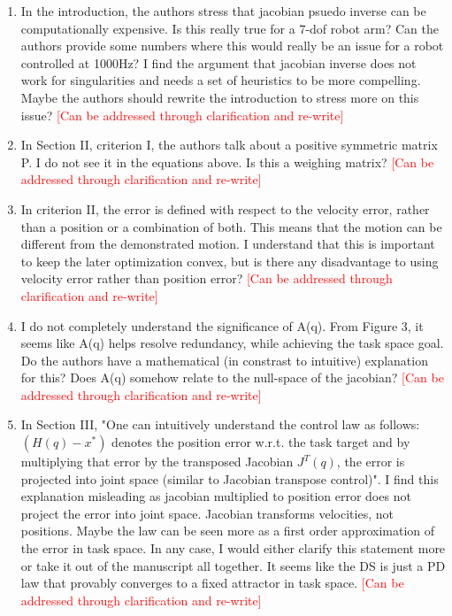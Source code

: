 \documentclass[10pt,stdletter,dateno]{newlfm}
\begin{document}
\begin{newlfm}
\begin{enumerate}
\item In the introduction, the authors stress that jacobian psuedo inverse
can be computationally expensive. Is this really true for a 7-dof robot
arm? Can the authors provide some numbers where this would really be an
issue for a robot controlled at 1000Hz? I find the argument that
jacobian inverse does not work for singularities and needs a set of
heuristics to be more compelling. Maybe the authors should rewrite the
introduction to stress more on this issue? \textcolor{red}{[Can be addressed through clarification and re-write]}


\item In Section II, criterion I, the authors talk about a positive
symmetric matrix P. I do not see it in the equations above. Is this a
weighing matrix? \textcolor{red}{[Can be addressed through clarification and re-write]}


\item In criterion II, the error is defined with respect to the velocity
error, rather than a position or a combination of both. This means that
the motion can be different from the demonstrated motion. I understand
that this is important to keep the later optimization convex, but is
there any disadvantage to using velocity error rather than position
error? \textcolor{red}{[Can be addressed through clarification and re-write]}


\item I do not completely understand the significance of A(q). From Figure
3, it seems like A(q) helps resolve redundancy, while achieving the
task space goal. Do the authors have a mathematical (in constrast to
intuitive) explanation for this? Does A(q) somehow relate to the
null-space of the jacobian? \textcolor{red}{[Can be addressed through clarification and re-write]}


\item In Section III, "One can intuitively understand the control law as
follows:$ (H(q)-x^*)$ denotes the position error w.r.t. the task target
and by multiplying that error by the transposed Jacobian $J^T(q)$, the
error is projected into joint space (similar to Jacobian transpose
control)". I find this explanation misleading as jacobian multiplied to
position error does not project the error into joint space. Jacobian
transforms velocities, not positions. Maybe the law can be seen more as
a first order approximation of the error in task space. In any case, I
would either clarify this statement more or take it out of the
manuscript all together. It seems like the DS is just a PD law that
provably converges to a fixed attractor in task space. \textcolor{red}{[Can be addressed through clarification and re-write]}



\end{enumerate}
\end{newlfm}
\end{document}
